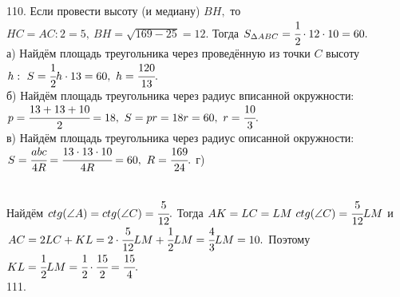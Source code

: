 \documentclass[12pt]{article}
\begin{document}
110. Если провести высоту (и медиану) $BH,$ то $HC=AC:2=5,\ BH=\sqrt{169-25}=12.$ Тогда $S_{\Delta ABC}=\cfrac{1}{2}\cdot12\cdot10=60.$\\
а) Найдём площадь треугольника через проведённую из точки $C$ высоту $h:\ S=\cfrac{1}{2}h\cdot13=60,\ h=\cfrac{120}{13}.$\\
б) Найдём площадь треугольника через радиус вписанной окружности: $p=\cfrac{13+13+10}{2}=18,\ S=pr=18r=60,\ r=\cfrac{10}{3}.$\\
в) Найдём площадь треугольника через радиус описанной окружности: $S=\cfrac{abc}{4R}=\cfrac{13\cdot13\cdot10}{4R}=60,\ R=\cfrac{169}{24}.$\newpage\noindent
г) \begin{figure}[ht!]
\end{figure}\\
Найдём $ctg(\angle A)=ctg(\angle C)=\cfrac{5}{12}.$ Тогда $AK=LC=LM\ ctg(\angle C)=\cfrac{5}{12}LM$ и $AC=2LC+KL=2\cdot\cfrac{5}{12}LM+\cfrac{1}{2}LM=\cfrac{4}{3}LM=10.$ Поэтому $KL=\cfrac{1}{2}LM=\cfrac{1}{2}\cdot\cfrac{15}{2}=\cfrac{15}{4}.$\\
111. \begin{figure}[ht!]
\end{figure}\\
\end{document}
